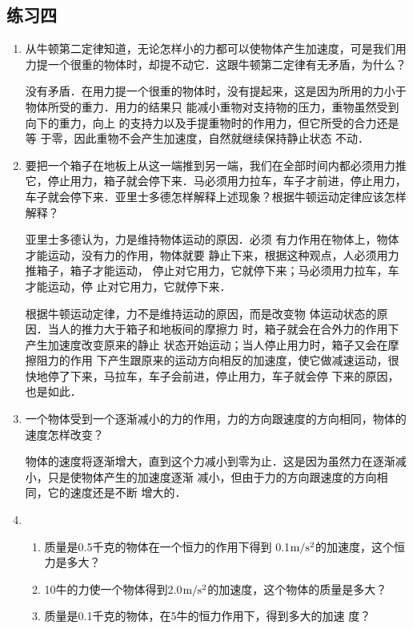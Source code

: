 \subsection{练习四}
\begin{enumerate}
	\item 从牛顿第二定律知道，无论怎样小的力都可以使物体产生加速度，可是我们用力提一个很重的物体时，却提不动它．这跟牛顿第二定律有无矛盾，为什么？
	 
    \begin{solution}
        没有矛盾．在用力提一个很重的物体时，没有提起来，这是因为所用的力小于物体所受的重力．用力的结果只
能减小重物对支持物的压力，重物虽然受到向下的重力，向上
的支持力以及手提重物时的作用力，但它所受的合力还是等
于零，因此重物不会产生加速度，自然就继续保持静止状态
不动．
    \end{solution}
\item 要把一个箱子在地板上从这一端推到另一端，我们在全部时间内都必须用力推它，停止用力，箱子就会停下来．马必须用力拉车，车子才前进，停止用力，车子就会停下来．亚里士多德怎样解释上述现象？根据牛顿运动定律应该怎样解释？
	 
\begin{solution}
    亚里士多德认为，力是维持物体运动的原因．必须
    有力作用在物体上，物体才能运动，没有力的作用，物体就要
    静止下来，根据这种观点，人必须用力推箱子，箱子才能运动，
    停止对它用力，它就停下来；马必须用力拉车，车才能运动，停
    止对它用力，它就停下来．

    根据牛顿运动定律，力不是维持运动的原因，而是改变物
    体运动状态的原因．当人的推力大于箱子和地板间的摩擦力
    时，箱子就会在合外力的作用下产生加速度改变原来的静止
    状态开始运动；当人停止用力时，箱子又会在摩擦阻力的作用
    下产生跟原来的运动方向相反的加速度，使它做减速运动，很
    快地停了下来，马拉车，车子会前进，停止用力，车子就会停
    下来的原因，也是如此．
\end{solution}
\item 一个物体受到一个逐渐减小的力的作用，力的方向跟速度的方向相同，物体的速度怎样改变？
	 
\begin{solution}
    物体的速度将逐渐增大，直到这个力减小到零为止．这是因为虽然力在逐渐减小，只是使物体产生的加速度逐渐
    减小，但由于力的方向跟速度的方向相同，它的速度还是不断
    增大的．
\end{solution}
\item \begin{enumerate}
\item  质量是0.5千克的物体在一个恒力的作用下得到
0.1$\text{m}/\text{s}^2$的加速度，这个恒力是多大？
\item 10牛的力使一个物体得到2.0$\text{m}/\text{s}^2$的加速度，这个物体的质量是多大？
\item 质量是0.1千克的物体，在5牛的恒力作用下，得到多大的加速
度？
\end{enumerate}
	 

\end{enumerate}
